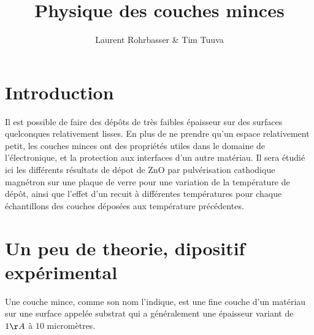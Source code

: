 \documentclass[a4paper,12pt,oneside]{article}
\begin{document}
\title{Physique des couches minces}
\author{Laurent Rohrbasser \& Tim Tuuva}

\maketitle
\tableofcontents
\baselineskip=16pt
\parindent=15pt
\parskip=5pt


\newpage


\section{Introduction}
Il est possible de faire des dépôts de très faibles épaisseur sur des surfaces quelconques relativement lisses. En plus de ne prendre qu'un espace relativement petit, les couches minces ont des propriétés utiles dans le domaine de l'électronique, et la protection aux interfaces d'un autre matériau. Il sera étudié ici les différents résultats de dépot de ZnO par pulvérisation cathodique magnétron sur une plaque de verre pour une variation de la température de dépôt, ainsi que l'effet d'un recuit à différentes températures pour chaque échantillons des couches déposées aux température précédentes.

\section{Un peu de theorie, dipositif expérimental}

Une couche mince, comme son nom l'indique, est une fine couche d'un matériau sur une surface appelée substrat qui a généralement une épaisseur variant de $1\AA$ à $10$ micromètres.
\end{document}
